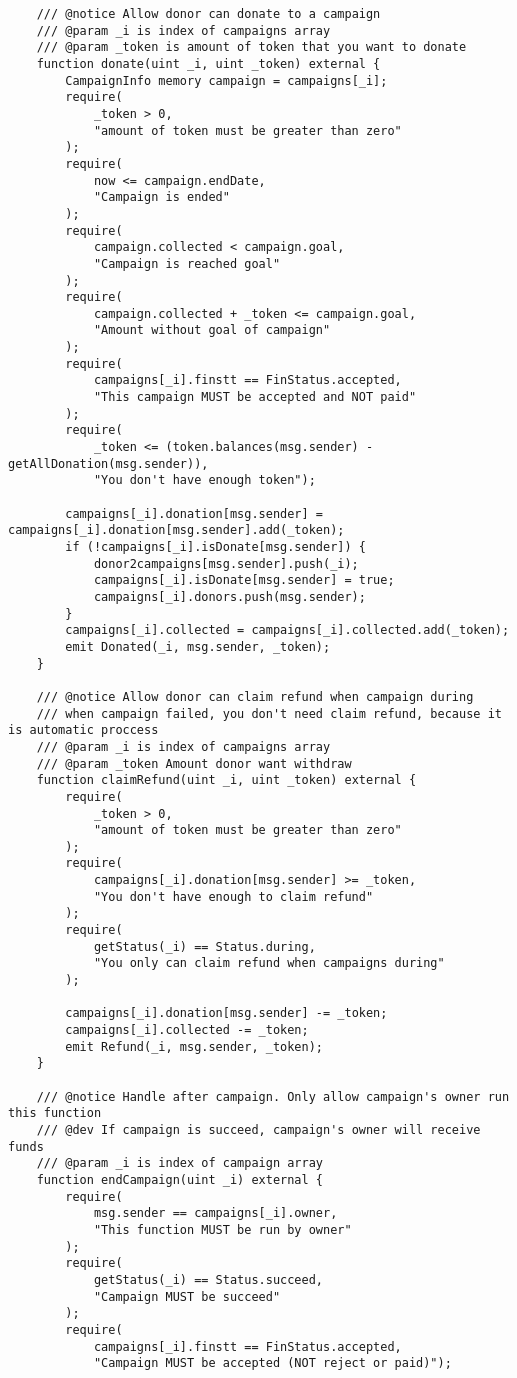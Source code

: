 \documentclass[../main-report.tex]{subfiles}
\begin{document}
\begin{lstlisting}
    /// @notice Allow donor can donate to a campaign
    /// @param _i is index of campaigns array
    /// @param _token is amount of token that you want to donate
    function donate(uint _i, uint _token) external {
        CampaignInfo memory campaign = campaigns[_i];
        require(
            _token > 0,
            "amount of token must be greater than zero"
        );
        require(
            now <= campaign.endDate,
            "Campaign is ended"
        );
        require(
            campaign.collected < campaign.goal,
            "Campaign is reached goal"
        );
        require(
            campaign.collected + _token <= campaign.goal,
            "Amount without goal of campaign"
        );
        require(
            campaigns[_i].finstt == FinStatus.accepted,
            "This campaign MUST be accepted and NOT paid"
        );
        require(
            _token <= (token.balances(msg.sender) - getAllDonation(msg.sender)),
            "You don't have enough token");

        campaigns[_i].donation[msg.sender] = campaigns[_i].donation[msg.sender].add(_token);
        if (!campaigns[_i].isDonate[msg.sender]) {
            donor2campaigns[msg.sender].push(_i);
            campaigns[_i].isDonate[msg.sender] = true;
            campaigns[_i].donors.push(msg.sender);
        }
        campaigns[_i].collected = campaigns[_i].collected.add(_token);
        emit Donated(_i, msg.sender, _token);
    }

    /// @notice Allow donor can claim refund when campaign during
    /// when campaign failed, you don't need claim refund, because it is automatic proccess
    /// @param _i is index of campaigns array
    /// @param _token Amount donor want withdraw
    function claimRefund(uint _i, uint _token) external {
        require(
            _token > 0,
            "amount of token must be greater than zero"
        );
        require(
            campaigns[_i].donation[msg.sender] >= _token,
            "You don't have enough to claim refund"
        );
        require(
            getStatus(_i) == Status.during,
            "You only can claim refund when campaigns during"
        );

        campaigns[_i].donation[msg.sender] -= _token;
        campaigns[_i].collected -= _token;
        emit Refund(_i, msg.sender, _token);
    }

    /// @notice Handle after campaign. Only allow campaign's owner run this function
    /// @dev If campaign is succeed, campaign's owner will receive funds
    /// @param _i is index of campaign array
    function endCampaign(uint _i) external {
        require(
            msg.sender == campaigns[_i].owner,
            "This function MUST be run by owner"
        );
        require(
            getStatus(_i) == Status.succeed,
            "Campaign MUST be succeed"
        );
        require(
            campaigns[_i].finstt == FinStatus.accepted,
            "Campaign MUST be accepted (NOT reject or paid)");


\end{lstlisting}
\end{document}
